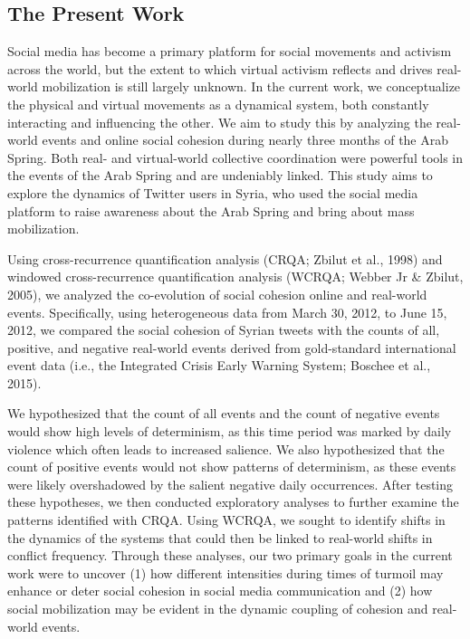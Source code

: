 \documentclass[
  english,
  man]{apa6}
\begin{document}
\hypertarget{the-present-work}{%
\subsection{The Present Work}\label{the-present-work}}

Social media has become a primary platform for social movements and activism
across the world, but the extent to which virtual activism reflects and drives
real-world mobilization is still largely unknown. In the current work, we
conceptualize the physical and virtual movements as a dynamical system, both
constantly interacting and influencing the other. We aim to study this by
analyzing the real-world events and online social cohesion during nearly three
months of the Arab Spring. Both real- and virtual-world collective coordination
were powerful tools in the events of the Arab Spring and are undeniably linked.
This study aims to explore the dynamics of Twitter users in Syria, who used the
social media platform to raise awareness about the Arab Spring and bring about
mass mobilization.

Using cross-recurrence quantification analysis (CRQA; Zbilut et al., 1998) and
windowed cross-recurrence quantification analysis (WCRQA; Webber Jr \& Zbilut, 2005), we analyzed the co-evolution of social cohesion online
and real-world events. Specifically, using heterogeneous data from March 30,
2012, to June 15, 2012, we compared the social cohesion of Syrian tweets with
the counts of all, positive, and negative real-world events derived from
gold-standard international event data (i.e., the Integrated Crisis Early
Warning System; Boschee et al., 2015).

We hypothesized that the count of all events and the count of negative events
would show high levels of determinism, as this time period was marked by daily
violence which often leads to increased salience. We also hypothesized that the
count of positive events would not show patterns of determinism, as these events
were likely overshadowed by the salient negative daily occurrences. After
testing these hypotheses, we then conducted exploratory analyses to further
examine the patterns identified with CRQA. Using WCRQA, we sought to identify
shifts in the dynamics of the systems that could then be linked to real-world
shifts in conflict frequency. Through these analyses, our two primary goals in
the current work were to uncover (1) how different intensities during times of
turmoil may enhance or deter social cohesion in social media communication and
(2) how social mobilization may be evident in the dynamic coupling of cohesion
and real-world events.
\end{document}
